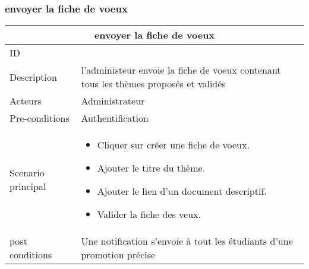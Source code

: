 \documentclass[11pt,fleqn]{book} %
\begin{document}
\subsubsection{envoyer la fiche de voeux}
\begin{center}
\begin{tabularx}{1\textwidth} { | p{4cm} | >{\raggedright\arraybackslash}X |  }
  \hline
  \multicolumn{2}{|c|}{envoyer la fiche de voeux} \\
 \hline
 ID & 3  \\
 \hline
 Description  & l'administeur envoie la fiche de voeux contenant tous les thèmes proposés et validés \\
  \hline
 Acteurs  & Administrateur   \\
  \hline
 Pre-conditions  & Authentification\\
 \hline
 Scenario principal  &  
 \begin{itemize}
     \item Cliquer sur créer une fiche de voeux.
     \item Ajouter le titre du thème.
     \item Ajouter le lien d’un document descriptif.
     \item Valider la fiche des veux.

 \end{itemize}\\
  \hline
 post conditions  &  Une notification s’envoie à tout les étudiants d’une promotion précise  \\
  \hline
\end{tabularx}
\label{tbl:nicetablelesstable}
\end{center}
\end{document}
